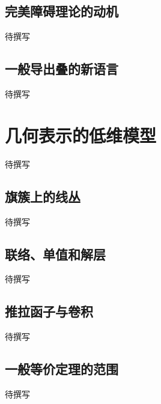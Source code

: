 \subsection{完美障碍理论的动机}
\label{g5:subsec:B02:03}
待撰写

\subsection{一般导出叠的新语言}
\label{g5:subsec:B02:04}
待撰写

\section{几何表示的低维模型}
\label{g5:sec:B03}
待撰写

\subsection{旗簇上的线丛}
\label{g5:subsec:B03:01}
待撰写

\subsection{联络、单值和解层}
\label{g5:subsec:B03:02}
待撰写

\subsection{推拉函子与卷积}
\label{g5:subsec:B03:03}
待撰写

\subsection{一般等价定理的范围}
\label{g5:subsec:B03:04}
待撰写
